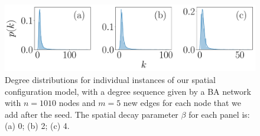 \documentclass[%
 reprint,
 amsmath,amssymb,
 aps,
]{revtex4-1}
\begin{document}


\begin{figure}
    \centering
    \includegraphics[width=1.0\linewidth]{spatial_configuration_degree_distribution.pdf}
    \caption{Degree distributions for individual instances of our spatial configuration 
     model, with a degree sequence given by a BA network with $n=1010$ nodes and $m=5$ new edges for each node that we add after the seed. The spatial decay parameter $\beta$ for each panel is: (a) 0; (b) 2; (c) 4.
     }
\end{figure}
\end{document}
